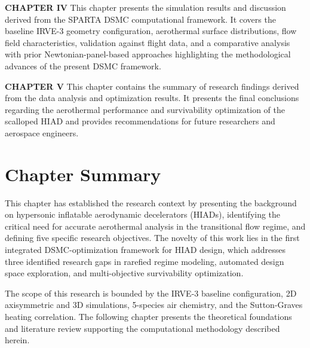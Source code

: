\textbf{CHAPTER IV} This chapter presents the simulation results and discussion derived from the SPARTA DSMC computational framework. It covers the baseline IRVE-3 geometry configuration, aerothermal surface distributions, flow field characteristics, validation against flight data, and a comparative analysis with prior Newtonian-panel-based approaches highlighting the methodological advances of the present DSMC framework.

\textbf{CHAPTER V} This chapter contains the summary of research findings derived from the data analysis and optimization results. It presents the final conclusions regarding the aerothermal performance and survivability optimization of the scalloped HIAD and provides recommendations for future researchers and aerospace engineers.

\section*{Chapter Summary}
This chapter has established the research context by presenting the background on hypersonic inflatable aerodynamic decelerators (HIADs), identifying the critical need for accurate aerothermal analysis in the transitional flow regime, and defining five specific research objectives. The novelty of this work lies in the first integrated DSMC-optimization framework for HIAD design, which addresses three identified research gaps in rarefied regime modeling, automated design space exploration, and multi-objective survivability optimization.

The scope of this research is bounded by the IRVE-3 baseline configuration, 2D axisymmetric and 3D simulations, 5-species air chemistry, and the Sutton-Graves heating correlation. The following chapter presents the theoretical foundations and literature review supporting the computational methodology described herein.
